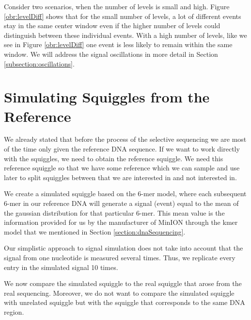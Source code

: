 Consider two scenarios, when the number of levels is small and high.
Figure \ref{obr:levelDiff} shows that for the small number of levels, a lot of
different events stay in the same center window even if the higher number of levels
could distinguish between these individual events. With a high number of levels,
like we see in Figure \ref{obr:levelDiff} one event is less likely to remain within the same window.
We will address the signal oscillations in more detail in Section \ref{subsection:oscillations}.

\section{Simulating Squiggles from the Reference}

We already stated that before the process of the selective sequencing we are most
of the time only given the reference DNA sequence. If we want to work directly with the squiggles,
we need to obtain the reference squiggle. We need this reference squiggle
so that we have some reference which we can sample and use later to split squiggles
between that we are interested in and not interested in.

We create a simulated squiggle based on the 6-mer model,
where each subsequent 6-mer in our reference DNA will generate a signal (event) equal to
the mean of the gaussian distribution for that particular 6-mer. This mean value
is the information provided for us by the manufacturer of MinION through the kmer model
that we mentioned in Section \ref{section:dnaSequencing}.

Our simplistic approach to signal simulation does not take into account that the
signal from one nucleotide is measured several times. Thus, we replicate every entry in the simulated signal
10 times.

We now compare the simulated squiggle to the real squiggle that arose from the real
sequencing. Moreover, we do not want to compare the simulated squiggle with unrelated squiggle
but with the squiggle that corresponds to the same DNA region.

